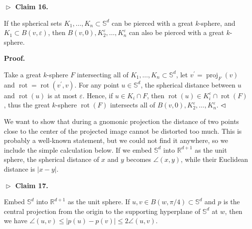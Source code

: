 \documentclass[10pt,a4paper]{amsart}
\begin{document}
\par
\par
\par\medskip\noindent\textbf{$\vartriangleright$ Claim 16.}\par
If the spherical sets $K_{1},\ldots,K_{n}\subset\mathbb{S}^{d}$ can be pierced with a great $k$-sphere, and $K_{1}\subset B(v,\varepsilon)$, then $B(v,0),K_{2}^{\varepsilon},\ldots,K_{n}^{\varepsilon}$ can also be pierced with a great $k$-sphere.
\par
\par
\par
\par
\par\medskip\noindent\textbf{Proof.}\par
Take a great $k$-sphere $F$ intersecting all of $K_{1},\ldots,K_{n}\subset\mathbb{S}^{d}$, let $v^{\prime}=\operatorname{proj}_{F}(v)$ and $\operatorname{rot}=\operatorname{rot}(v^{\prime},v)$. For any point $u\in\mathbb{S}^{d}$, the spherical distance between $u$ and $\operatorname{rot}(u)$ is at most $\varepsilon$. Hence, if $u\in K_{i}\cap F$, then $\operatorname{rot}(u)\in K_{i}^{\varepsilon}\cap\operatorname{rot}(F)$, thus the great $k$-sphere $\operatorname{rot}(F)$ intersects all of $B(v,0),K_{2}^{\varepsilon},\ldots,K_{n}^{\varepsilon}$. $\hfill\vartriangleleft$
\par
\par
We want to show that during a gnomonic projection the distance of two points close to the center of the projected image cannot be distorted too much. This is probably a well-known statement, but we could not find it anywhere, so we include the simple calculation below. If we embed $\mathbb{S}^{d}$ into $\mathbb{R}^{d+1}$ as the unit sphere, the spherical distance of $x$ and $y$ becomes $\angle(x,y)$, while their Euclidean distance is $|x-y|$.
\par
\par
\par\medskip\noindent\textbf{$\vartriangleright$ Claim 17.}\par
Embed $\mathbb{S}^{d}$ into $\mathbb{R}^{d+1}$ as the unit sphere. If $u,v\in B(w,\pi/4)\subset\mathbb{S}^{d}$ and $p$ is the central projection from the origin to the supporting hyperplane of $\mathbb{S}^{d}$ at $w$, then we have $\angle(u,v)\leq|p(u)-p(v)|\leq 2\angle(u,v)$.
\par
\par
\par
\par
\end{document}

